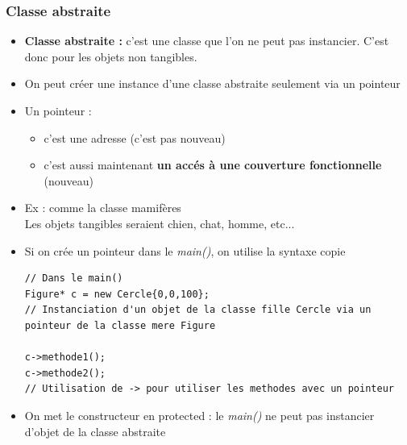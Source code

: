 \documentclass[12pt,a4paper]{article}
\begin{document}
\subsubsection{Classe abstraite}
\begin{itemize}
\item \textbf{Classe abstraite :} c'est une classe que l'on ne peut pas instancier. C'est donc pour les objets non tangibles.
\item On peut créer une instance d'une classe abstraite seulement via un pointeur
\item Un pointeur : 
\begin{itemize}
\item c'est une adresse (c'est pas nouveau)
\item c'est aussi maintenant \textbf{un accés à une couverture fonctionnelle} (nouveau)
\end{itemize}
\item Ex : comme la classe mamifères\\
Les objets tangibles seraient chien, chat, homme, etc...
\item Si on crée un pointeur dans le \textit{main()}, on utilise la syntaxe
copie 
\begin{lstlisting}
// Dans le main()
Figure* c = new Cercle{0,0,100};
// Instanciation d'un objet de la classe fille Cercle via un pointeur de la classe mere Figure

c->methode1();
c->methode2();
// Utilisation de -> pour utiliser les methodes avec un pointeur
\end{lstlisting}
\item On met le constructeur en protected : le \textit{main()} ne peut pas instancier d'objet de la classe abstraite
\end{itemize}
\end{document}
